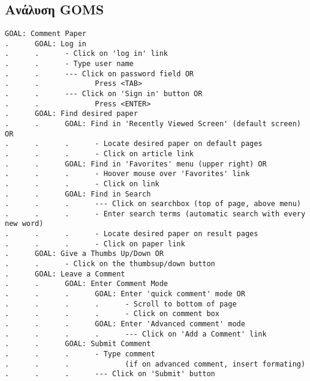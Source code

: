 \documentclass[a4paper,10pt]{article}
\begin{document}
\def\thesubsection {Ζήτημα \Roman{subsection})}



\section*{} 
\subsection{Ανάλυση GOMS}


\begin{lstlisting}
GOAL: Comment Paper
.      GOAL: Log in
.      .      - Click on 'log in' link
.      .      - Type user name
.      .      --- Click on password field OR
.      .             Press <TAB>
.      .      --- Click on 'Sign in' button OR
.      .             Press <ENTER>
.      GOAL: Find desired paper
.      .      GOAL: Find in 'Recently Viewed Screen' (default screen) OR
.      .      .      - Locate desired paper on default pages
.      .      .      - Click on article link
.      .      GOAL: Find in 'Favorites' menu (upper right) OR
.      .      .      - Hoover mouse over 'Favorites' link
.      .      .      - Click on link
.      .      GOAL: Find in Search
.      .      .      --- Click on searchbox (top of page, above menu)
.      .      .      - Enter search terms (automatic search with every new word)
.      .      .      - Locate desired paper on result pages
.      .      .      - Click on paper link
.      GOAL: Give a Thumbs Up/Down OR
.      .      - Click on the thumbsup/down button
.      GOAL: Leave a Comment
.      .      GOAL: Enter Comment Mode
.      .      .      GOAL: Enter 'quick comment' mode OR
.      .      .      .      - Scroll to bottom of page
.      .      .      .      - Click on comment box
.      .      .      GOAL: Enter 'Advanced comment' mode
.      .      .      .      --- Click on 'Add a Comment' link
.      .      GOAL: Submit Comment
.      .      .      - Type comment
.      .      .             (if on advanced comment, insert formating)
.      .      .      --- Click on 'Submit' button
\end{lstlisting}
\end{document}
